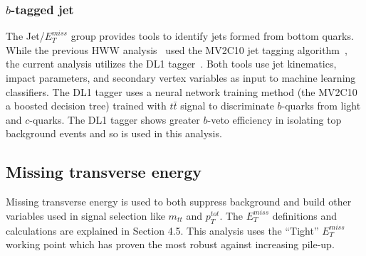 \subsubsection{$b$-tagged jet}

The Jet/$E_T^{miss}$ group provides tools to identify jets formed from bottom quarks. While the previous HWW analysis~\cite{Aaboud_2019} used the MV2C10 jet tagging algorithm~\cite{MV2C10}, the current analysis utilizes the DL1 tagger~\cite{DL1}. Both tools use jet kinematics, impact parameters, and secondary vertex variables as input to machine learning classifiers. The DL1 tagger uses a neural network training method (the MV2C10 a boosted decision tree) trained with $t\bar{t}$ signal to discriminate $b$-quarks from light and $c$-quarks. The DL1 tagger shows greater $b$-veto efficiency in isolating top background events and so is used in this analysis. 

\subsection{Missing transverse energy}

Missing transverse energy is used to both suppress background and build other variables used in signal selection like $m_{tt}$ and $p_T^{tot}$. The $E_T^{miss}$ definitions and calculations are explained in Section 4.5. This analysis uses the ``Tight'' $E_T^{miss}$ working point which has proven the most robust against increasing pile-up.

